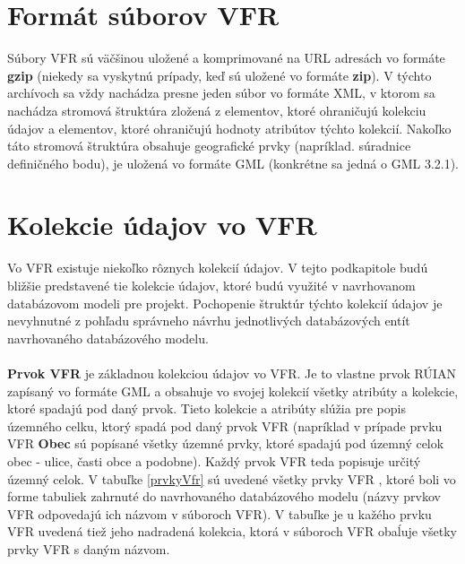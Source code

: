\section{Formát súborov VFR}
Súbory VFR sú väčšinou uložené a komprimované na URL adresách vo formáte {\bf gzip} (niekedy sa vyskytnú prípady, keď sú uložené vo formáte {\bf zip}). V týchto archívoch sa vždy nachádza presne jeden súbor vo formáte XML, v ktorom sa nachádza stromová štruktúra zložená z elementov, ktoré ohraničujú kolekciu údajov a elementov, ktoré ohraničujú hodnoty atribútov týchto kolekcií. Nakoľko táto stromová štruktúra obsahuje geografické prvky (napríklad. súradnice definičného bodu), je uložená vo formáte GML (konkrétne sa jedná o GML 3.2.1)\cite{Gml}. 
\section {Kolekcie údajov vo VFR}
Vo VFR existuje niekoľko rôznych kolekcií údajov. V tejto podkapitole budú bližšie predstavené tie kolekcie údajov, ktoré budú využité v navrhovanom databázovom modeli pre projekt. Pochopenie štruktúr týchto kolekcií údajov je nevyhnutné z pohľadu správneho návrhu jednotlivých databázových entít navrhovaného databázového modelu. \\ \\
{\bf Prvok VFR} je základnou kolekciou údajov vo VFR. Je to vlastne prvok RÚIAN zapísaný vo formáte GML a obsahuje vo svojej kolekcií všetky atribúty a kolekcie, ktoré spadajú pod daný prvok. Tieto kolekcie a atribúty slúžia pre popis územného celku, ktorý spadá pod daný prvok VFR (napríklad v prípade prvku VFR {\bf Obec} sú popísané všetky územné prvky, ktoré spadajú pod územný celok obec - ulice, časti obce a podobne). Každý prvok VFR teda popisuje určitý územný celok. V tabuľke \ref{prvkyVfr} sú uvedené všetky prvky VFR , ktoré boli vo forme tabuliek zahrnuté do navrhovaného databázového modelu (názvy prvkov VFR odpovedajú ich názvom v súboroch VFR). V tabuľke je u kažého prvku VFR uvedená tiež jeho nadradená kolekcia, ktorá v súboroch VFR obaĺuje všetky prvky VFR s daným názvom.
